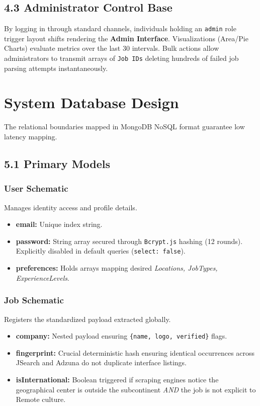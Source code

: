 \documentclass[12pt,a4paper,oneside]{report}
\begin{document}
\section{4.3 Administrator Control Base}
By logging in through standard channels, individuals holding an \texttt{admin} role trigger layout shifts rendering the \textbf{Admin Interface}.
Visualizations (Area/Pie Charts) evaluate metrics over the last 30 intervals. Bulk actions allow administrators to transmit arrays of \texttt{Job IDs} deleting hundreds of failed job parsing attempts instantaneously.

\chapter{System Database Design}
The relational boundaries mapped in MongoDB NoSQL format guarantee low latency mapping.

\section{5.1 Primary Models}

\subsection{User Schematic}
Manages identity access and profile details.
\begin{itemize}
    \item \textbf{email:} Unique index string.
    \item \textbf{password:} String array secured through \texttt{Bcrypt.js} hashing (12 rounds). Explicitly disabled in default queries (\texttt{select: false}).
    \item \textbf{preferences:} Holds arrays mapping desired \textit{Locations, JobTypes, ExperienceLevels}.
\end{itemize}

\subsection{Job Schematic}
Registers the standardized payload extracted globally.
\begin{itemize}
    \item \textbf{company:} Nested payload ensuring \texttt{\{name, logo, verified\}} flags.
    \item \textbf{fingerprint:} Crucial deterministic hash ensuring identical occurrences across JSearch and Adzuna do not duplicate interface listings.
    \item \textbf{isInternational:} Boolean triggered if scraping engines notice the geographical center is outside the subcontinent \textit{AND} the job is not explicit to Remote culture.
\end{itemize}
\end{document}
